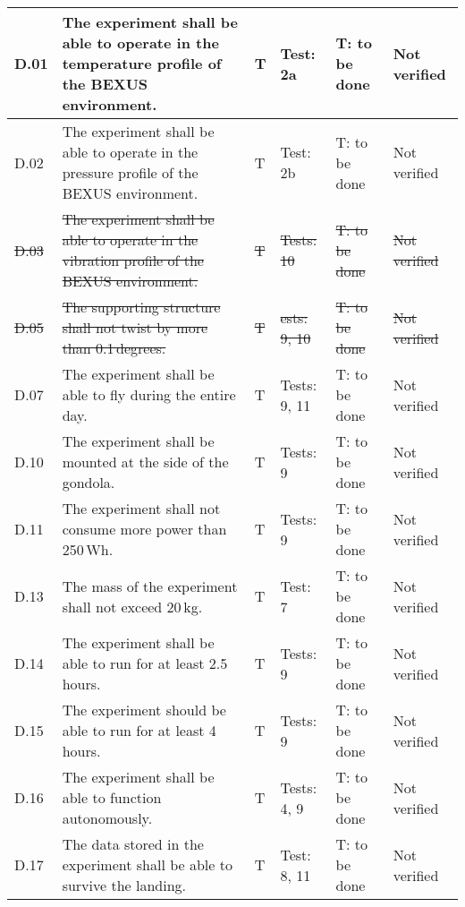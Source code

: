 \begin{longtable}[]{|m{}| m{}|m{}|m{}|m{}|m{}|}
D.01 & The experiment shall be able to operate in the temperature profile of the BEXUS environment.
& T & Test: 2a & T: to be done & Not verified \\\hline

D.02 & The experiment shall be able to operate in the pressure profile of the BEXUS environment.
& T & Test: 2b  & T: to be done & Not verified \\\hline

\st{D.03} & \st{The experiment shall be able to operate in the vibration profile of the BEXUS environment.}
& \st{T} & \st{Tests: 10} & \st{T: to be done} & \st{Not verified} \\\hline

\st{D.05 }& \st{The supporting structure shall not twist by more than 0.1\,degrees.}
& \st{T} & \st{ests: 9, 10} & \st{T: to be done} & \st{Not verified} \\\hline

D.07 & The experiment shall be able to fly during the entire day.
& T & Tests: 9, 11 & T: to be done & Not verified \\\hline

D.10 & The experiment shall be mounted at the side of the gondola.
& T & Tests: 9 & T: to be done & Not verified \\\hline

D.11 & The experiment shall not consume more power than 250\,Wh.
& T & Tests: 9 & T: to be done & Not verified \\\hline

D.13 & The mass of the experiment shall not exceed 20\,kg.
& T & Test: 7 & T: to be done & Not verified \\\hline

D.14 & The experiment shall be able to run for at least 2.5\,hours.
& T & Tests: 9 & T: to be done & Not verified \\\hline

D.15 & The experiment should be able to run for at least 4\,hours.
& T & Tests: 9 & T: to be done & Not verified \\\hline

D.16 & The experiment shall be able to function autonomously.
& T & Tests: 4, 9 & T: to be done & Not verified \\\hline

D.17 & The data stored in the experiment shall be able to survive the landing.
& T & Test: 8, 11 & T: to be done & Not verified \\\hline


\end{longtable}

